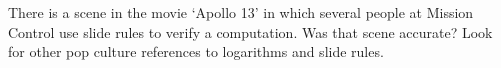 {There is a scene in the movie `Apollo 13' in which several people at Mission Control use slide rules to verify a computation.  Was that scene accurate?  Look for other pop culture references to logarithms and slide rules.}